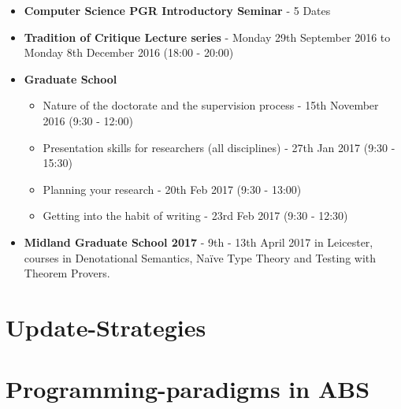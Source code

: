 \begin{appendices}
\begin{itemize}
\item \textbf{Computer Science PGR Introductory Seminar} - 5 Dates
\item \textbf{Tradition of Critique Lecture series} - Monday 29th September 2016 to Monday 8th December 2016 (18:00 - 20:00)
\item \textbf{Graduate School}
	\begin{itemize}	
		\item Nature of the doctorate and the supervision process - 15th November 2016 (9:30 - 12:00)
		\item Presentation skills for researchers (all disciplines) - 27th Jan 2017 (9:30 - 15:30)
		\item Planning your research - 20th Feb 2017 (9:30 - 13:00)
		\item Getting into the habit of writing - 23rd Feb 2017 (9:30 - 12:30)
	\end{itemize}
\item \textbf{Midland Graduate School 2017} - 9th - 13th April 2017 in Leicester, courses in Denotational Semantics, Naïve Type Theory and Testing with Theorem Provers.
\end{itemize}

\chapter{Update-Strategies}
\label{app:updateStrategies}


\chapter{Programming-paradigms in ABS}
\label{app:paradigms}




\end{appendices}